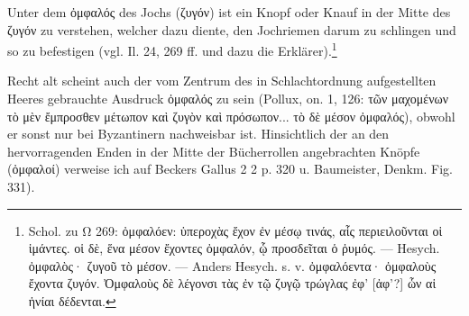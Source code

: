 \documentclass[a4paper, 11pt, oneside]{article}
\begin{document}
Unter dem ὀμφαλός des Jochs (ζυγόν) ist ein Knopf oder Knauf in der Mitte des ζυγόν zu verstehen, welcher dazu diente, den Jochriemen darum zu schlingen und so zu befestigen (vgl. Il. 24, 269 ff. und dazu die Erklärer).\footnote{Schol. zu Ω 269: ὀμφαλόεν: ὑπεροχὰς ἔχον ἐν μέσῳ τινάς, αἷς περιειλοῦνται οἱ ἱμάντες. οἱ δὲ, ἕνα μέσον ἔχοντες ὀμφαλόν, ᾧ προσδεῖται ὁ ῥυμός. --- Hesych. ὀμφαλὸς· ζυγοῦ τὸ μέσον. --- Anders Hesych. s. v. ὀμφαλόεντα· ὀμφαλοὺς ἔχοντα ζυγόν. Ὀμφαλοὺς δὲ λέγονσι τὰς ἐν τῷ ζυγῷ τρώγλας ἐφ' [ἀφ'?] ὧν αἱ ἡνίαι δέδενται.}

Recht alt scheint auch der vom Zentrum des in Schlachtordnung aufgestellten Heeres gebrauchte Ausdruck ὀμφαλός zu sein (Pollux, on. 1, 126: τῶν μαχομένων τὸ μὲν ἔμπροσθεν μέτωπον καὶ ζυγὸν καὶ πρόσωπον... τὸ δὲ μέσον ὀμφαλός), obwohl er sonst nur bei Byzantinern nachweisbar ist. Hinsichtlich der an den hervorragenden Enden in der Mitte der Bücherrollen angebrachten Knöpfe (ὀμφαλοί) verweise ich auf Beckers Gallus 2 2 p. 320 u. Baumeister, Denkm. Fig. 331).
\end{document}
